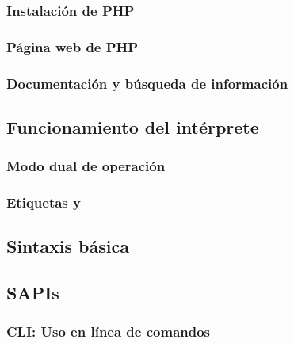 \documentclass[a4paper,11pt,spanish]{sphinxmanual}
\begin{document}
\subsubsection{Instalación de PHP}
\label{\detokenize{php:instalacion-de-php}}

\subsubsection{Página web de PHP}
\label{\detokenize{php:pagina-web-de-php}}

\subsubsection{Documentación y búsqueda de información}
\label{\detokenize{php:documentacion-y-busqueda-de-informacion}}

\subsection{Funcionamiento del intérprete}
\label{\detokenize{php:funcionamiento-del-interprete}}

\subsubsection{Modo dual de operación}
\label{\detokenize{php:modo-dual-de-operacion}}

\subsubsection{Etiquetas  y }
\label{\detokenize{php:etiquetas-php-y}}

\subsection{Sintaxis básica}
\label{\detokenize{php:sintaxis-basica}}

\subsection{SAPIs}
\label{\detokenize{php:sapis}}

\subsubsection{CLI: Uso en línea de comandos}
\label{\detokenize{php:cli-uso-en-linea-de-comandos}}
\end{document}
